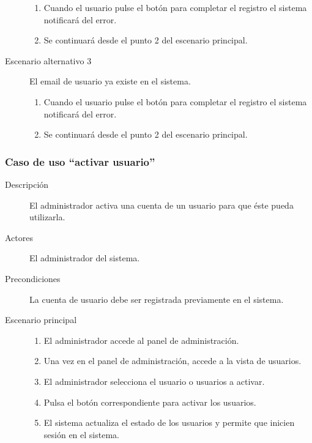 \begin{description}
\begin{enumerate}
								\item Cuando el usuario pulse el botón para completar el registro el sistema notificará del error.
								\item Se continuará desde el punto 2 del escenario principal.
								\end{enumerate}
\item[Escenario alternativo 3]	El email de usuario ya existe en el sistema.
								\begin{enumerate}
								\item Cuando el usuario pulse el botón para completar el registro el sistema notificará del error.
								\item Se continuará desde el punto 2 del escenario principal.
								\end{enumerate}
\end{description}


\subsubsection{Caso de uso ``activar usuario''}
\begin{description}
\item[Descripción] 				El administrador activa una cuenta de un usuario para que éste pueda utilizarla.
\item[Actores]					El administrador del sistema.
\item[Precondiciones]			La cuenta de usuario debe ser registrada previamente en el sistema.
\item[Escenario principal]	 	\hfill
								\begin{enumerate}
								\item El administrador accede al panel de administración.
								\item Una vez en el panel de administración, accede a la vista de usuarios.
								\item El administrador selecciona el usuario o usuarios a activar.
								\item Pulsa el botón correspondiente para activar los usuarios.
								\item El sistema actualiza el estado de los usuarios y permite que inicien sesión en el sistema.
								\end{enumerate}
\end{description}


